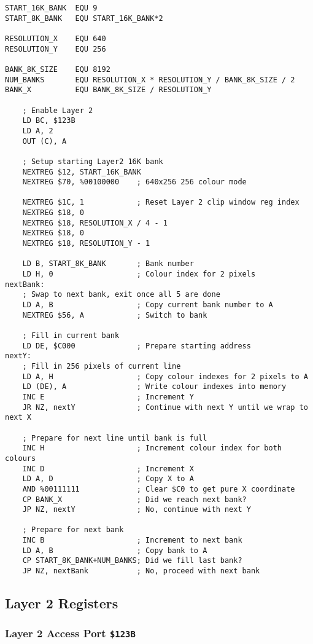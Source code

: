 \documentclass[12pt,twoside,openright,a4paper]{book}
\begin{document}
\begin{Verbatim}
START_16K_BANK  EQU 9
START_8K_BANK   EQU START_16K_BANK*2

RESOLUTION_X    EQU 640
RESOLUTION_Y    EQU 256

BANK_8K_SIZE    EQU 8192
NUM_BANKS       EQU RESOLUTION_X * RESOLUTION_Y / BANK_8K_SIZE / 2
BANK_X          EQU BANK_8K_SIZE / RESOLUTION_Y

	; Enable Layer 2
	LD BC, $123B
	LD A, 2
	OUT (C), A

	; Setup starting Layer2 16K bank
	NEXTREG $12, START_16K_BANK
	NEXTREG $70, %00100000    ; 640x256 256 colour mode

	NEXTREG $1C, 1            ; Reset Layer 2 clip window reg index
	NEXTREG $18, 0
	NEXTREG $18, RESOLUTION_X / 4 - 1
	NEXTREG $18, 0
	NEXTREG $18, RESOLUTION_Y - 1

	LD B, START_8K_BANK       ; Bank number
	LD H, 0                   ; Colour index for 2 pixels
nextBank:
	; Swap to next bank, exit once all 5 are done
	LD A, B                   ; Copy current bank number to A
	NEXTREG $56, A            ; Switch to bank

	; Fill in current bank
	LD DE, $C000              ; Prepare starting address
nextY:
	; Fill in 256 pixels of current line
	LD A, H                   ; Copy colour indexes for 2 pixels to A
	LD (DE), A                ; Write colour indexes into memory
	INC E                     ; Increment Y
	JR NZ, nextY              ; Continue with next Y until we wrap to next X

	; Prepare for next line until bank is full
	INC H                     ; Increment colour index for both colours
	INC D                     ; Increment X
	LD A, D                   ; Copy X to A
	AND %00111111             ; Clear $C0 to get pure X coordinate
	CP BANK_X                 ; Did we reach next bank?
	JP NZ, nextY              ; No, continue with next Y

	; Prepare for next bank
	INC B                     ; Increment to next bank
	LD A, B                   ; Copy bank to A
	CP START_8K_BANK+NUM_BANKS; Did we fill last bank?
	JP NZ, nextBank           ; No, proceed with next bank
\end{Verbatim}


\subsection{Layer 2 Registers}
\label{zx_next_layer2_registers}

\subsubsection{Layer 2 Access Port {\tt \$123B}}
\end{document}
